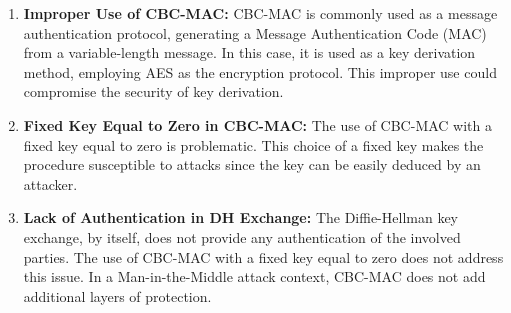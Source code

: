 \documentclass[12pt]{article}
\begin{document}
    \begin{enumerate}
        \item \textbf{Improper Use of CBC-MAC:} CBC-MAC is commonly used as a message authentication protocol, generating a Message Authentication Code (MAC) from a variable-length message. In this case, it is used as a key derivation method, employing AES as the encryption protocol. This improper use could compromise the security of key derivation.

        \item \textbf{Fixed Key Equal to Zero in CBC-MAC:} The use of CBC-MAC with a fixed key equal to zero is problematic. This choice of a fixed key makes the procedure susceptible to attacks since the key can be easily deduced by an attacker.

        \item \textbf{Lack of Authentication in DH Exchange:} The Diffie-Hellman key exchange, by itself, does not provide any authentication of the involved parties. The use of CBC-MAC with a fixed key equal to zero does not address this issue. In a Man-in-the-Middle attack context, CBC-MAC does not add additional layers of protection.
    \end{enumerate}
\end{document}
